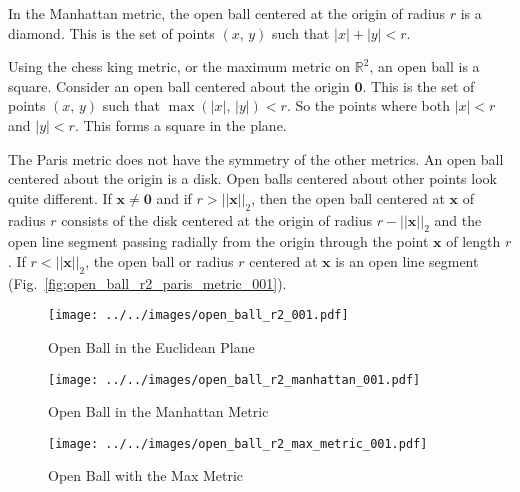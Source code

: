 \documentclass{article}
\theoremstyle{plain}
\theoremstyle{normal}
\newenvironment{example}{%
    \pushQED{\qed}\renewcommand{\qedsymbol}{$\blacksquare$}\examplex%
}{%
    \popQED\endexamplex%
}
\begin{document}
        \begin{example}
            In the Manhattan metric, the open ball centered at the origin of
            radius $r$ is a diamond. This is the set of points
            $(x,\,y)$ such that $|x|+|y|<r$.
        \end{example}
        \begin{example}
            Using the chess king metric, or the maximum metric on
            $\mathbb{R}^{2}$, an open ball is a square. Consider an open ball
            centered about the origin $\mathbf{0}$. This is the set of points
            $(x,\,y)$ such that $\max(|x|,\,|y|)<r$. So the points where both
            $|x|<r$ and $|y|<r$. This forms a square in the plane.
        \end{example}
        \begin{example}
            The Paris metric does not have the symmetry of the other metrics.
            An open ball centered about the origin is a disk. Open balls
            centered about other points look quite different. If
            $\mathbf{x}\ne\mathbf{0}$ and if $r>||\mathbf{x}||_{2}$, then
            the open ball centered at $\mathbf{x}$ of radius $r$ consists of
            the disk centered at the origin of radius
            $r-||\mathbf{x}||_{2}$ and the open line segment passing radially
            from the origin through the point $\mathbf{x}$
            of length $r$. If $r<||\mathbf{x}||_{2}$, the open ball or radius
            $r$ centered at $\mathbf{x}$ is an open line segment
            (Fig.~\ref{fig:open_ball_r2_paris_metric_001}).
        \end{example}
        \begin{figure}
            \centering
            \texttt{[image: ../../images/open\_ball\_r2\_001.pdf]}
            \caption{Open Ball in the Euclidean Plane}
            \label{fig:open_ball_r2_001}
        \end{figure}
        \begin{figure}
            \centering
            \texttt{[image: ../../images/open\_ball\_r2\_manhattan\_001.pdf]}
            \caption{Open Ball in the Manhattan Metric}
            \label{fig:open_ball_r2_manhattan_001}
        \end{figure}
        \begin{figure}
            \centering
            \texttt{[image: ../../images/open\_ball\_r2\_max\_metric\_001.pdf]}
            \caption{Open Ball with the Max Metric}
            \label{fig:open_ball_r2_max_metric_001}
        \end{figure}
\end{document}
